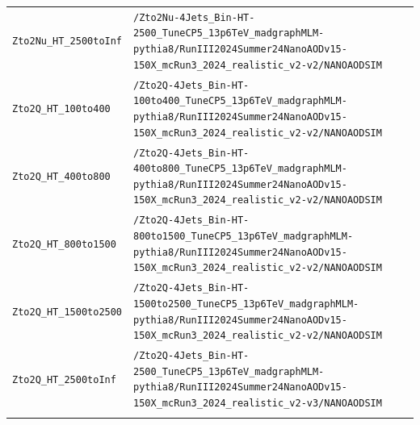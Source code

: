 \begin{longtable}{@{}>{\RaggedRight\arraybackslash}p{} >{\RaggedRight\arraybackslash}p{}@{}}
\addlinespace[2pt]
\texttt{Zto2Nu\_\allowbreak{}HT\_\allowbreak{}2500toInf} & \texttt{/\allowbreak{}Zto2Nu-\allowbreak{}4Jets\_\allowbreak{}Bin-\allowbreak{}HT-\allowbreak{}2500\_\allowbreak{}TuneCP5\_\allowbreak{}13p6TeV\_\allowbreak{}madgraphMLM-\allowbreak{}pythia8/\allowbreak{}RunIII2024Summer24NanoAODv15-\allowbreak{}150X\_\allowbreak{}mcRun3\_\allowbreak{}2024\_\allowbreak{}realistic\_\allowbreak{}v2-\allowbreak{}v2/\allowbreak{}NANOAODSIM} \\
\addlinespace[2pt]
\texttt{Zto2Q\_\allowbreak{}HT\_\allowbreak{}100to400} & \texttt{/\allowbreak{}Zto2Q-\allowbreak{}4Jets\_\allowbreak{}Bin-\allowbreak{}HT-\allowbreak{}100to400\_\allowbreak{}TuneCP5\_\allowbreak{}13p6TeV\_\allowbreak{}madgraphMLM-\allowbreak{}pythia8/\allowbreak{}RunIII2024Summer24NanoAODv15-\allowbreak{}150X\_\allowbreak{}mcRun3\_\allowbreak{}2024\_\allowbreak{}realistic\_\allowbreak{}v2-\allowbreak{}v2/\allowbreak{}NANOAODSIM} \\
\addlinespace[2pt]
\texttt{Zto2Q\_\allowbreak{}HT\_\allowbreak{}400to800} & \texttt{/\allowbreak{}Zto2Q-\allowbreak{}4Jets\_\allowbreak{}Bin-\allowbreak{}HT-\allowbreak{}400to800\_\allowbreak{}TuneCP5\_\allowbreak{}13p6TeV\_\allowbreak{}madgraphMLM-\allowbreak{}pythia8/\allowbreak{}RunIII2024Summer24NanoAODv15-\allowbreak{}150X\_\allowbreak{}mcRun3\_\allowbreak{}2024\_\allowbreak{}realistic\_\allowbreak{}v2-\allowbreak{}v2/\allowbreak{}NANOAODSIM} \\
\addlinespace[2pt]
\texttt{Zto2Q\_\allowbreak{}HT\_\allowbreak{}800to1500} & \texttt{/\allowbreak{}Zto2Q-\allowbreak{}4Jets\_\allowbreak{}Bin-\allowbreak{}HT-\allowbreak{}800to1500\_\allowbreak{}TuneCP5\_\allowbreak{}13p6TeV\_\allowbreak{}madgraphMLM-\allowbreak{}pythia8/\allowbreak{}RunIII2024Summer24NanoAODv15-\allowbreak{}150X\_\allowbreak{}mcRun3\_\allowbreak{}2024\_\allowbreak{}realistic\_\allowbreak{}v2-\allowbreak{}v2/\allowbreak{}NANOAODSIM} \\
\addlinespace[2pt]
\texttt{Zto2Q\_\allowbreak{}HT\_\allowbreak{}1500to2500} & \texttt{/\allowbreak{}Zto2Q-\allowbreak{}4Jets\_\allowbreak{}Bin-\allowbreak{}HT-\allowbreak{}1500to2500\_\allowbreak{}TuneCP5\_\allowbreak{}13p6TeV\_\allowbreak{}madgraphMLM-\allowbreak{}pythia8/\allowbreak{}RunIII2024Summer24NanoAODv15-\allowbreak{}150X\_\allowbreak{}mcRun3\_\allowbreak{}2024\_\allowbreak{}realistic\_\allowbreak{}v2-\allowbreak{}v2/\allowbreak{}NANOAODSIM} \\
\addlinespace[2pt]
\texttt{Zto2Q\_\allowbreak{}HT\_\allowbreak{}2500toInf} & \texttt{/\allowbreak{}Zto2Q-\allowbreak{}4Jets\_\allowbreak{}Bin-\allowbreak{}HT-\allowbreak{}2500\_\allowbreak{}TuneCP5\_\allowbreak{}13p6TeV\_\allowbreak{}madgraphMLM-\allowbreak{}pythia8/\allowbreak{}RunIII2024Summer24NanoAODv15-\allowbreak{}150X\_\allowbreak{}mcRun3\_\allowbreak{}2024\_\allowbreak{}realistic\_\allowbreak{}v2-\allowbreak{}v3/\allowbreak{}NANOAODSIM} \\
\addlinespace[2pt]
\end{longtable}
